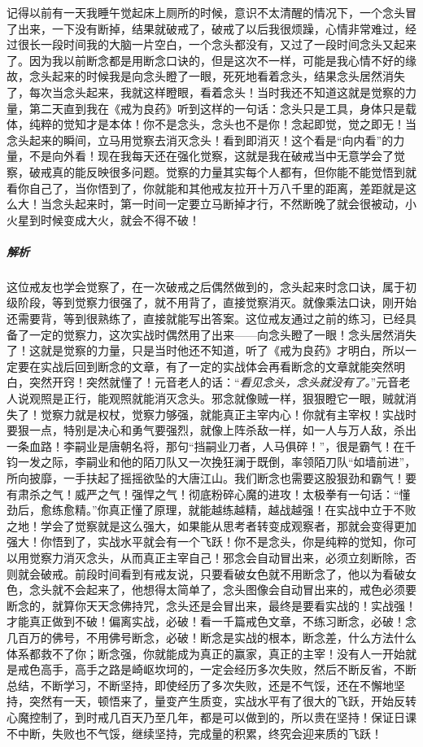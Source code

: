 \begin{case}
    记得以前有一天我睡午觉起床上厕所的时候，意识不太清醒的情况下，一个念头冒了出来，一下没有断掉，结果就破戒了，破戒了以后我很烦躁，心情非常难过，经过很长一段时间我的大脑一片空白，一个念头都没有，又过了一段时间念头又起来了。因为我以前断念都是用断念口诀的，但是这次不一样，可能是我心情不好的缘故，念头起来的时候我是向念头瞪了一眼，死死地看着念头，结果念头居然消失了，每次当念头起来，我就这样瞪眼，看着念头！当时我还不知道这就是觉察的力量，第二天直到我在《戒为良药》听到这样的一句话：念头只是工具，身体只是载体，纯粹的觉知才是本体！你不是念头，念头也不是你！念起即觉，觉之即无！当念头起来的瞬间，立马用觉察去消灭念头！看到即消灭！这个看是“向内看”的力量，不是向外看！现在我每天还在强化觉察，这就是我在破戒当中无意学会了觉察，破戒真的能反映很多问题。觉察的力量其实每个人都有，但你能不能觉悟到就看你自己了，当你悟到了，你就能和其他戒友拉开十万八千里的距离，差距就是这么大！当念头起来时，第一时间一定要立马断掉才行，不然断晚了就会很被动，小火星到时候变成大火，就会不得不破！
    \subparagraph{解析} 这位戒友也学会觉察了，在一次破戒之后偶然做到的，念头起来时念口诀，属于初级阶段，等到觉察力很强了，就不用背了，直接觉察消灭。就像乘法口诀，刚开始还需要背，等到很熟练了，直接就能写出答案。这位戒友通过之前的练习，已经具备了一定的觉察力，这次实战时偶然用了出来——向念头瞪了一眼！念头居然消失了！这就是觉察的力量，只是当时他还不知道，听了《戒为良药》才明白，所以一定要在实战后回到断念的文章，有了一定的实战体会再看断念的文章就能突然明白，突然开窍！突然就懂了！元音老人的话：“\textit{看见念头，念头就没有了。}”元音老人说观照是正行，能观照就能消灭念头。邪念就像贼一样，狠狠瞪它一眼，贼就消失了！觉察力就是权杖，觉察力够强，就能真正主宰内心！你就有主宰权！实战时要狠一点，特别是决心和勇气要强烈，就像上阵杀敌一样，如一人与万人敌，杀出一条血路！李嗣业是唐朝名将，那句“挡嗣业刀者，人马俱碎！”，很是霸气！在千钧一发之际，李嗣业和他的陌刀队又一次挽狂澜于既倒，率领陌刀队“如墙前进”，所向披靡，一手扶起了摇摇欲坠的大唐江山。我们断念也需要这股狠劲和霸气！要有肃杀之气！威严之气！强悍之气！彻底粉碎心魔的进攻！太极拳有一句话：“懂劲后，愈练愈精。”你真正懂了原理，就能越练越精，越战越强！在实战中立于不败之地！学会了觉察就是这么强大，如果能从思考者转变成观察者，那就会变得更加强大！你悟到了，实战水平就会有一个飞跃！你不是念头，你是纯粹的觉知，你可以用觉察力消灭念头，从而真正主宰自己！邪念会自动冒出来，必须立刻断除，否则就会破戒。前段时间看到有戒友说，只要看破女色就不用断念了，他以为看破女色，念头就不会起来了，他想得太简单了，念头图像会自动冒出来的，戒色必须要断念的，就算你天天念佛持咒，念头还是会冒出来，最终是要看实战的！实战强！才能真正做到不破！偏离实战，必破！看一千篇戒色文章，不练习断念，必破！念几百万的佛号，不用佛号断念，必破！断念是实战的根本，断念差，什么方法什么体系都救不了你；断念强，你就能成为真正的赢家，真正的主宰！没有人一开始就是戒色高手，高手之路是崎岖坎坷的，一定会经历多次失败，然后不断反省，不断总结，不断学习，不断坚持，即使经历了多次失败，还是不气馁，还在不懈地坚持，突然有一天，顿悟来了，量变产生质变，实战水平有了很大的飞跃，开始反转心魔控制了，到时戒几百天乃至几年，都是可以做到的，所以贵在坚持！保证日课不中断，失败也不气馁，继续坚持，完成量的积累，终究会迎来质的飞跃！
\end{case}

